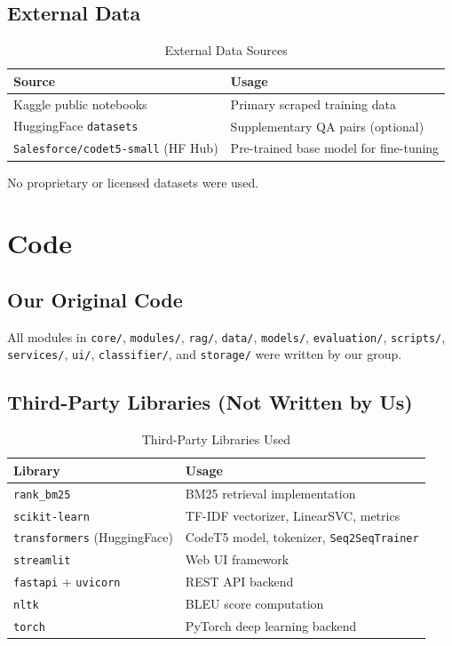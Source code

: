 \documentclass[12pt,a4paper]{article}
\begin{document}
\subsection{External Data}

\begin{table}[h!]
\centering
\caption{External Data Sources}
\begin{tabular}{ll}
\toprule
Source & Usage \\
\midrule
Kaggle public notebooks & Primary scraped training data \\
HuggingFace \texttt{datasets} & Supplementary QA pairs (optional) \\
\texttt{Salesforce/codet5-small} (HF Hub) & Pre-trained base model for fine-tuning \\
\bottomrule
\end{tabular}
\end{table}

No proprietary or licensed datasets were used.

\section{Code}

\subsection{Our Original Code}

All modules in \texttt{core/}, \texttt{modules/}, \texttt{rag/}, \texttt{data/}, \texttt{models/}, \texttt{evaluation/}, \texttt{scripts/}, \texttt{services/}, \texttt{ui/}, \texttt{classifier/}, and \texttt{storage/} were written by our group.

\subsection{Third-Party Libraries (Not Written by Us)}

\begin{table}[h!]
\centering
\caption{Third-Party Libraries Used}
\begin{tabular}{ll}
\toprule
Library & Usage \\
\midrule
\texttt{rank\_bm25} & BM25 retrieval implementation \\
\texttt{scikit-learn} & TF-IDF vectorizer, LinearSVC, metrics \\
\texttt{transformers} (HuggingFace) & CodeT5 model, tokenizer, \texttt{Seq2SeqTrainer} \\
\texttt{streamlit} & Web UI framework \\
\texttt{fastapi} + \texttt{uvicorn} & REST API backend \\
\texttt{nltk} & BLEU score computation \\
\texttt{torch} & PyTorch deep learning backend \\
\bottomrule
\end{tabular}
\end{table}
\end{document}
